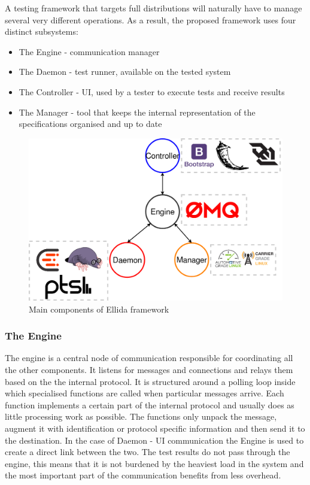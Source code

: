 A testing framework that targets full distributions will naturally have to manage several very different operations. As a result, the proposed framework uses four distinct subsystems:
\begin{itemize}
\item The Engine - communication manager
\item The Daemon - test runner, available on the tested system
\item The Controller - UI, used by a tester to execute tests and receive results
\item The Manager - tool that keeps the internal representation of the specifications organised and up to date
\end{itemize}

\begin{figure}[h!]
  \centering
	\includegraphics[width=\textwidth]{images/ellida_arch.png}
    \caption{Main components of Ellida framework}
\end{figure}

\subsubsection*{The Engine}
The engine is a central node of communication responsible for coordinating all the other components. It listens for messages and connections and relays them based on the the internal protocol. It is structured around a polling loop inside which specialised functions are called when particular messages arrive. Each function implements a certain part of the internal protocol and usually does as little processing work as possible. The functions only unpack the message, augment it with identification or protocol specific information and then send it to the destination. In the case of Daemon - UI communication the Engine is used to create a direct link between the two. The test results do not pass through the engine, this means that it is not burdened by the heaviest load in the system and the most important part of the communication benefits from less overhead.

